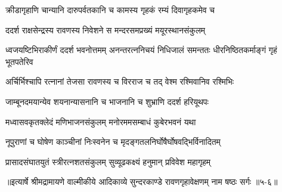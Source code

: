 \twolineshloka
{क्रीडागृहाणि चान्यानि दारुपर्वतकानि च}
{कामस्य गृहकं रम्यं दिवागृहकमेव च} %

\twolineshloka
{ददर्श राक्षसेन्द्रस्य रावणस्य निवेशने}
{स मन्दरसमप्रख्यं मयूरस्थानसंकुलम्} %

\threelineshloka
{ध्वजयष्टिभिराकीर्णं ददर्श भवनोत्तमम्}
{अनन्तरत्ननिचयं निधिजालं समन्ततः}
{धीरनिष्ठितकर्माङ्गं गृहं भूतपतेरिव} %

\twolineshloka
{अर्चिर्भिश्चापि रत्नानां तेजसा रावणस्य च}
{विरराज च तद् वेश्म रश्मिवानिव रश्मिभिः} %

\twolineshloka
{जाम्बूनदमयान्येव शयनान्यासनानि च}
{भाजनानि च शुभ्राणि ददर्श हरियूथपः} %

\twolineshloka
{मध्वासवकृतक्लेदं मणिभाजनसंकुलम्}
{मनोरममसम्बाधं कुबेरभवनं यथा} %

\twolineshloka
{नूपुराणां च घोषेण काञ्चीनां निःस्वनेन च}
{मृदङ्गतलनिर्घोषैर्घोषवद्भिर्विनादितम्} %

\twolineshloka
{प्रासादसंघातयुतं स्त्रीरत्नशतसंकुलम्}
{सुव्यूढकक्ष्यं हनुमान् प्रविवेश महागृहम्} %


॥इत्यार्षे श्रीमद्रामायणे वाल्मीकीये आदिकाव्ये सुन्दरकाण्डे रावणगृहावेक्षणम् नाम षष्ठः सर्गः ॥५-६॥
